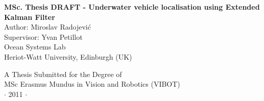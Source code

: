 
\newpage
\thispagestyle{empty}


\vspace*{2cm}
\begin{center}
{\Large\bf MSc. Thesis DRAFT - Underwater vehicle localisation using Extended Kalman Filter\\} \vspace{2cm} {\large
Author: Miroslav Radojevi\'c \\
Supervisor: Yvan Petillot    \\
\vspace{2cm}
Ocean Systems Lab \\
Heriot-Watt University, Edinburgh (UK)   
}

\end{center}

\vspace{7cm}
\begin{center}
{\large A Thesis Submitted for the Degree of \\MSc Erasmus Mundus
in Vision and Robotics (VIBOT) \\\vspace{0.3cm} $\cdot$ 2011
$\cdot$}
\end{center}
\singlespacing


